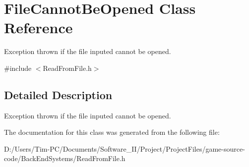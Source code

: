 \hypertarget{class_file_cannot_be_opened}{}\section{File\+Cannot\+Be\+Opened Class Reference}
\label{class_file_cannot_be_opened}


Exception thrown if the file inputed cannot be opened.  




{\ttfamily \#include $<$Read\+From\+File.\+h$>$}



\subsection{Detailed Description}
Exception thrown if the file inputed cannot be opened. 

The documentation for this class was generated from the following file\+:\begin{DoxyCompactItemize}
\item 
D\+:/\+Users/\+Tim-\/\+P\+C/\+Documents/\+Software\+\_\+\+I\+I/\+Project/\+Project\+Files/game-\/source-\/code/\+Back\+End\+Systems/Read\+From\+File.\+h\end{DoxyCompactItemize}

